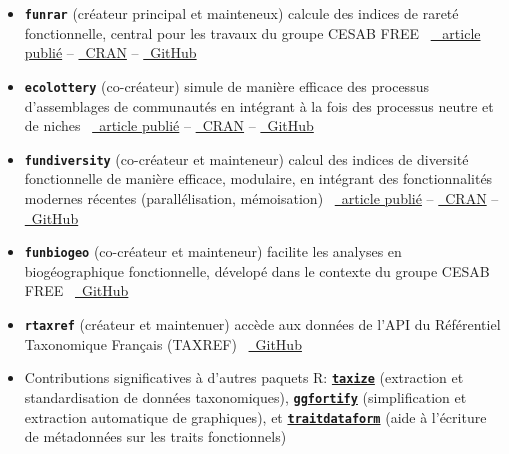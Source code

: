 \documentclass[10pt,a4paper,]{article}
\begin{document}
\begin{itemize}
\item
  \textbf{\texttt{funrar}} (créateur principal et mainteneux)
  \hfill\break calcule des indices de rareté fonctionnelle, central pour
  les travaux du groupe CESAB FREE
  \hfill\break ~\href{https://doi.org/10.1111/ddi.12629}{\faFile*~
  article publié} --
  \href{https://cran.r-project.org/package=funrar}{\faRProject~CRAN} --
  \href{https://github.com/Rekyt/funrar}{\faGithub~GitHub}
\item
  \textbf{\texttt{ecolottery}} (co-créateur) \hfill\break simule de
  manière efficace des processus d'assemblages de communautés en
  intégrant à la fois des processus neutre et de niches
  \hfill\break ~\href{https://doi.org/10.1111/2041-210X.12918}{\faFile*~article
  publié} --
  \href{https://cran.r-project.org/package=ecolottery}{\faRProject~CRAN}
  -- \href{https://github.com/frmunoz/ecolottery}{\faGithub~GitHub}
\item
  \textbf{\texttt{fundiversity}} (co-créateur et mainteneur)
  \hfill\break calcul des indices de diversité fonctionnelle de manière
  efficace, modulaire, en intégrant des fonctionnalités modernes
  récentes (parallélisation, mémoisation)
  \hfill\break ~\href{https://doi.org/10.1111/ecog.06585}{\faFile*~article
  publié} --
  \href{https://cran.r-project.org/package=fundiversity}{\faRProject~CRAN}
  -- \href{https://github.com/bisaloo/fundiversity}{\faGithub~GitHub}
\item
  \textbf{\texttt{funbiogeo}} (co-créateur et mainteneur)
  \hfill\break facilite les analyses en biogéographique fonctionnelle,
  dévelopé dans le contexte du groupe CESAB FREE
  \hfill\break ~\href{https://github.com/FRBCesab/funbiogeo}{\faGithub~GitHub}
\item
  \textbf{\texttt{rtaxref}} (créateur et maintenuer) \hfill\break accède
  aux données de l'API du Référentiel Taxonomique Français (TAXREF)
  \hfill\break ~\href{https://github.com/Rekyt/rtaxref}{\faGithub~GitHub}
\item
  Contributions significatives à d'autres paquets R:
  \href{https://cran.r-project.org/package=taxize}{\textbf{\texttt{taxize}}}
  (extraction et standardisation de données taxonomiques),
  \href{https://cran.r-project.org/package=ggfortify}{\textbf{\texttt{ggfortify}}}
  (simplification et extraction automatique de graphiques), et
  \href{https://cran.r-project.org/package=traitdataform}{\textbf{\texttt{traitdataform}}}
  (aide à l'écriture de métadonnées sur les traits fonctionnels)
\end{itemize}
\end{document}
